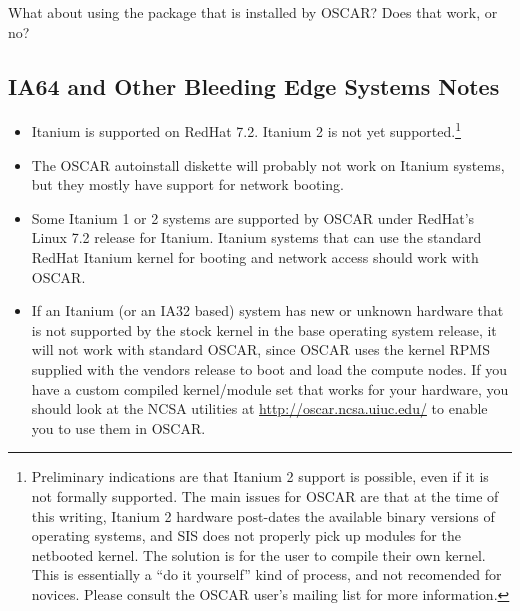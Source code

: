 \begin{itemize}
  \begin{discuss}
    What about using the  package that is
    installed by OSCAR?  Does that work, or no?
  \end{discuss}

\end{itemize}


\subsection{IA64 and Other Bleeding Edge Systems Notes}
\label{subsec:ia64notes}

\begin{itemize}
  
\item Itanium is supported on RedHat 7.2.  Itanium 2 is not yet
  supported.\footnote{Preliminary indications are that Itanium 2
    support is possible, even if it is not formally supported.  The
    main issues for OSCAR are that at the time of this writing,
    Itanium 2 hardware post-dates the available binary versions of
    operating systems, and SIS does not properly pick up modules for
    the netbooted kernel.  The solution is for the user to compile
    their own kernel.  This is essentially a ``do it yourself'' kind
    of process, and not recomended for novices.  Please consult the
    OSCAR user's mailing list for more information.}

\item The OSCAR autoinstall diskette will probably not work on Itanium
  systems, but they mostly have support for network booting.
  
\item Some Itanium 1 or 2 systems are supported by OSCAR under
  RedHat's Linux 7.2 release for Itanium.  Itanium systems that can
  use the standard RedHat Itanium kernel for booting and network
  access should work with OSCAR.
  
\item If an Itanium (or an IA32 based) system has new or unknown
  hardware that is not supported by the stock kernel in the base
  operating system release, it will not work with standard OSCAR,
  since OSCAR uses the kernel RPMS supplied with the vendors release
  to boot and load the compute nodes.  If you have a custom compiled
  kernel/module set that works for your hardware, you should look at
  the NCSA utilities at \url{http://oscar.ncsa.uiuc.edu/} to
  enable you to use them in OSCAR.
\end{itemize}





